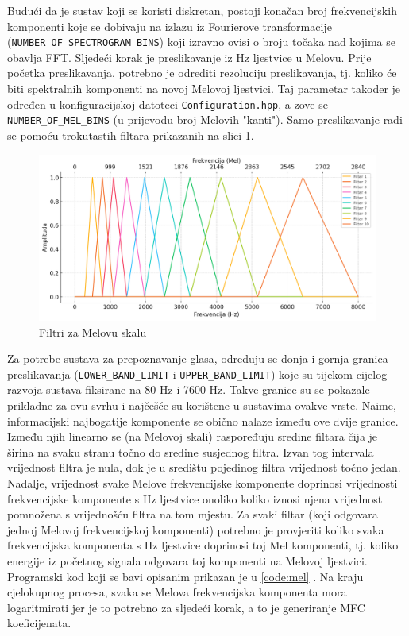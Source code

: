 Budući da je sustav koji se koristi diskretan, postoji konačan broj frekvencijskih komponenti koje 
se dobivaju na izlazu iz Fourierove transformacije \\ (\texttt{NUMBER\_OF\_SPECTROGRAM\_BINS}) koji
izravno ovisi o broju točaka nad kojima se obavlja FFT. Sljedeći korak je 
preslikavanje iz Hz ljestvice u Melovu. Prije početka preslikavanja, potrebno
je odrediti rezoluciju preslikavanja, tj. koliko će biti spektralnih komponenti na 
novoj Melovoj ljestvici. Taj parametar također je određen u konfiguracijskoj datoteci
\texttt{Configuration.hpp}, a zove se \texttt{NUMBER\_OF\_MEL\_BINS} (u prijevodu broj Melovih
"kanti"). Samo preslikavanje radi se  pomoću trokutastih filtara prikazanih na slici 
\ref{pic:melfilter}.

\begin{figure}[htb]
    \centering
    \includegraphics[width=0.8\linewidth]{Chapters/struktura_sustava/generiranje_znacajki/melfiltar.png} 
    \caption{Filtri za Melovu skalu}
    \label{pic:melfilter}
\end{figure}

Za potrebe sustava za prepoznavanje glasa, određuju se donja i gornja granica preslikavanja 
(\texttt{LOWER\_BAND\_LIMIT} i \texttt{UPPER\_BAND\_LIMIT}) koje su tijekom cijelog razvoja sustava fiksirane
na 80 Hz i 7600 Hz. Takve granice su se pokazale prikladne za ovu svrhu i najčešće
su korištene u sustavima ovakve vrste. Naime, informacijski najbogatije komponente
se obično nalaze između ove dvije granice. Između njih linearno se (na Melovoj skali)
raspoređuju sredine filtara čija je širina na svaku stranu 
točno do sredine susjednog filtra. Izvan tog intervala vrijednost filtra je nula, dok je u središtu
pojedinog filtra vrijednost točno jedan. Nadalje, vrijednost svake Melove frekvencijske
komponente doprinosi vrijednosti frekvencijske komponente s Hz ljestvice onoliko koliko iznosi
njena vrijednost pomnožena s vrijednošću filtra na tom mjestu. Za svaki filtar (koji odgovara
jednoj Melovoj frekvencijskoj komponenti) potrebno je provjeriti koliko svaka frekvencijska komponenta 
s Hz ljestvice doprinosi toj Mel komponenti, tj. koliko energije iz početnog signala
odgovara toj komponenti na Melovoj ljestvici. Programski kod koji se bavi opisanim prikazan je u 
\ref{code:mel} . Na kraju cjelokupnog procesa, svaka se Melova frekvencijska
komponenta mora logaritmirati jer je to potrebno za sljedeći korak, a to je generiranje MFC koeficijenata.

